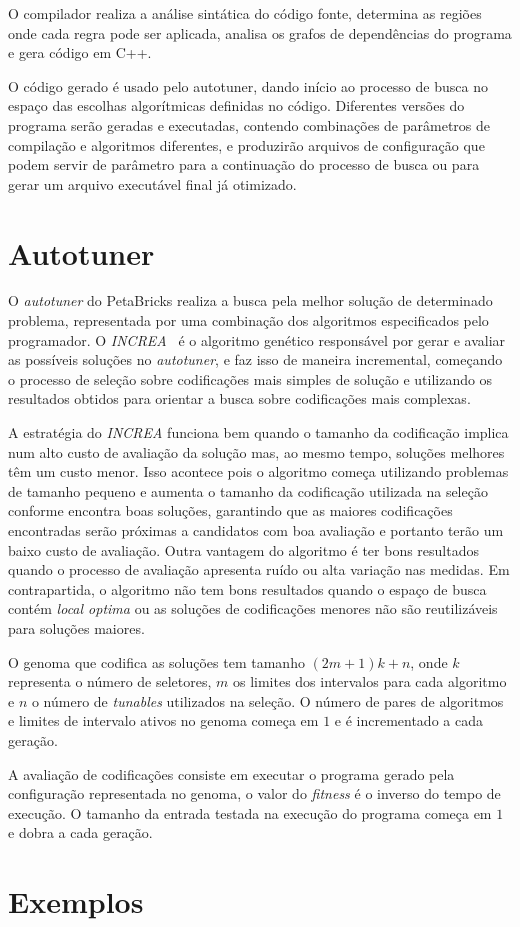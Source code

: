 \documentclass[a4paper, 11pt, twoside]{article}
\begin{document}
O compilador realiza a análise sintática do código
fonte, determina as regiões onde cada regra pode ser aplicada, analisa
os grafos de dependências do programa e gera código em C++.

O código gerado é usado pelo autotuner, dando início ao processo de busca no 
espaço das escolhas algorítmicas definidas no código. Diferentes versões
do programa serão geradas e executadas, contendo combinações de parâmetros de
compilação e algoritmos diferentes, e produzirão arquivos de configuração que
podem servir de parâmetro para a continuação do processo de busca ou para gerar
um arquivo executável final já otimizado.

\section{Autotuner}\label{sec:autotuner}

O \emph{autotuner} do PetaBricks realiza a busca pela melhor solução de 
determinado problema, representada por uma combinação dos algoritmos 
especificados pelo programador. O \emph{INCREA}~\cite{ansel2011efficient} é o 
algoritmo genético responsável por gerar e avaliar as possíveis soluções 
no \emph{autotuner}, e faz isso de maneira incremental, começando
o processo de seleção sobre codificações mais simples de solução e utilizando 
os resultados obtidos para orientar a busca sobre codificações mais complexas.

A estratégia do \emph{INCREA} funciona bem quando o tamanho da codificação
implica num alto custo de avaliação da solução mas, ao mesmo tempo, soluções
melhores têm um custo menor. Isso acontece pois o algoritmo começa utilizando
problemas de tamanho pequeno e aumenta o tamanho da codificação utilizada na 
seleção conforme encontra boas soluções, garantindo que as maiores codificações
encontradas serão próximas a candidatos com boa avaliação e portanto terão um
baixo custo de avaliação. Outra vantagem do algoritmo é ter bons resultados
quando o processo de avaliação apresenta ruído ou alta variação nas medidas.
Em contrapartida, o algoritmo não tem bons resultados quando o espaço de busca
contém \emph{local optima} ou as soluções de codificações menores não são
reutilizáveis para soluções maiores.

O genoma que codifica as soluções tem tamanho $(2m + 1)k + n$,
onde $k$ representa o número de seletores, $m$ os
limites dos intervalos para cada algoritmo e $n$ o número de \emph{tunables} 
utilizados na seleção. O número de pares de algoritmos e limites de intervalo
ativos no genoma começa em $1$ e é incrementado a cada geração.

A avaliação de codificações consiste em executar o programa gerado pela
configuração representada no genoma, o valor do \emph{fitness} é o inverso
do tempo de execução. O tamanho da entrada testada na execução do programa
começa em $1$ e dobra a cada geração.

\section{Exemplos}

\newpage


\end{document}
